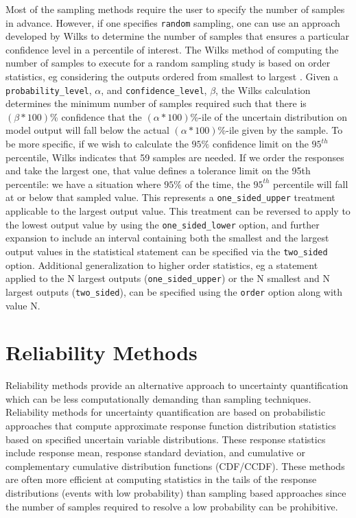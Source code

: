 Most of the sampling methods require the user to specify the number of
samples in advance.  However, if one specifies \texttt{random} sampling,
one can use an approach developed by Wilks\cite{Wilks} to determine
the number of samples that ensures a particular confidence level in
a percentile of interest.  The Wilks method of computing the number
of samples to execute for a random sampling study is based on order
statistics, eg considering the outputs ordered from smallest to largest
\cite{Wilks,Nutt04}.  Given a \texttt{probability\_level}, $\alpha$,
and \texttt{confidence\_level}, $\beta$, the Wilks calculation determines
the minimum number of samples required such that there is $(\beta*100)$\%
confidence that the $(\alpha*100)$\%-ile of the uncertain distribution
on model output will fall below the actual $(\alpha*100)$\%-ile given
by the sample.  To be more specific, if we wish to calculate the $95\%$
confidence limit on the $95^{th}$ percentile, Wilks indicates that 59
samples are needed.  If we order the responses and take the largest one,
that value defines a tolerance limit on the 95th percentile:  we have a
situation where $95\%$ of the time, the $95^{th}$ percentile will fall at
or below that sampled value.  This represents a \texttt{one\_sided\_upper}
treatment applicable to the largest output value.  This treatment
can be reversed to apply to the lowest output value by using the
\texttt{one\_sided\_lower} option, and further expansion to include an
interval containing both the smallest and the largest output values in
the statistical statement can be specified via the \texttt{two\_sided}
option.  Additional generalization to higher order statistics, eg a
statement applied to the N largest outputs (\texttt{one\_sided\_upper}) or the
N smallest and N largest outputs (\texttt{two\_sided}), can be specified
using the \texttt{order} option along with value N.

\section{Reliability Methods}\label{uq:reliability}

Reliability methods provide an alternative approach to uncertainty
quantification which can be less computationally demanding than
sampling techniques. Reliability methods for uncertainty
quantification are based on probabilistic approaches that compute
approximate response function distribution statistics based on
specified uncertain variable distributions. These response statistics
include response mean, response standard deviation, and cumulative or
complementary cumulative distribution functions (CDF/CCDF). These
methods are often more efficient at computing statistics in the tails
of the response distributions (events with low probability) than
sampling based approaches since the number of samples required to
resolve a low probability can be prohibitive.

